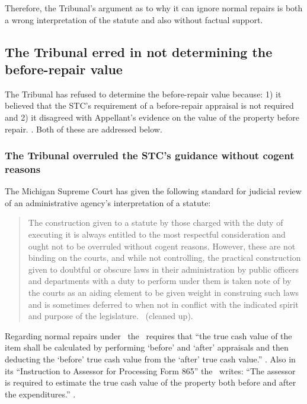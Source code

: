 \documentclass[12pt,\documentclassflag]{michiganCourtOfAppealsBrief}
\begin{document}
Therefore, the Tribunal's argument as to why it can ignore normal repairs is both a wrong interpretation of the statute and also without factual support.

\subsection{The Tribunal erred in not determining the before-repair value}

The Tribunal has refused to determine the before-repair value because:
1) it believed that the STC's requirement of a before-repair appraisal is not required
and
2) it disagreed with Appellant's evidence on the value of the property before repair.
\reconsiderationDenied[2]. Both of these are addressed below.

\subsubsection{The Tribunal overruled the STC's guidance
  without cogent reasons}
  

The Michigan Supreme Court has given the following standard for judicial review of an administrative agency's interpretation of a statute:

\begin{quote}
The construction given to a statute by those charged with the duty of executing it is always entitled to the most respectful consideration and ought not to be overruled without cogent reasons. However, these are not binding on the courts, and while not controlling, the practical construction given to doubtful or obscure laws in their administration by public officers and departments with a duty to perform under them is taken note of by the courts as an aiding element to be given weight in construing such laws and is sometimes deferred to when not in conflict with the indicated spirit and purpose of the legislature. \ (cleaned up).
\end{quote}

Regarding normal repairs under \mathieuGast\ the \STC\ requires that ``the true cash value of the item shall be calculated by performing `before' and `after' appraisals and then deducting the `before' true cash value from the `after' true cash value.'' . Also in its ``Instruction to Assessor for Processing Form 865'' the \STC\ writes:
 ``The assessor is required to estimate the true cash value of the property both before and after the expenditures.'' \stcform[2].
\end{document}
